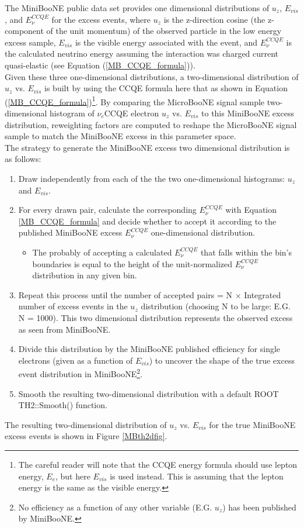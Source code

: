 The MiniBooNE public data set \cite{MB_lee_datarelease} provides one dimensional distributions of $u_z$, $E_{vis}$, and $E_\nu^{CCQE}$ for the excess events, where $u_z$ is the z-direction cosine (the z- component of the unit momentum) of the observed particle in the low energy excess sample, $E_{vis}$ is the visible energy associated with the event, and $E_{\nu}^{CCQE}$ is the calculated neutrino energy assuming the interaction was charged current quasi-elastic (see Equation (\ref{MB_CCQE_formula})).\\

Given these three one-dimensional distributions, a two-dimensional distribution of $u_z$ vs. $E_{vis}$ is built by using the CCQE formula here that as shown in Equation (\ref{MB_CCQE_formula})\footnote{The careful reader will note that the CCQE energy formula should use lepton energy, $E_e$, but here $E_{vis}$ is used instead. This is assuming that the lepton energy is the same as the visible energy.}. By comparing the MicroBooNE signal sample two-dimensional histogram of $\nu_e$CCQE electron $u_z$ vs. $E_{vis}$ to this MiniBooNE excess distribution, reweighting factors are computed to reshape the MicroBooNE signal sample to match the MiniBooNE excess in this parameter space.\\

The strategy to generate the MiniBooNE excess two dimensional distribution is as follows:
\begin{enumerate}
\item Draw independently from each of the the two one-dimensional histograms: $u_z$ and $E_{vis}$.
\item For every drawn pair, calculate the corresponding $E_\nu^{CCQE}$ with Equation \ref{MB_CCQE_formula} and decide whether to accept it according to the published MiniBooNE excess $E_\nu^{CCQE}$ one-dimensional distribution.
	\begin{itemize}
	\item The probably of accepting a calculated $E_\nu^{CCQE}$ that falls within the bin's boundaries is equal to the height of the unit-normalized $E_\nu^{CCQE}$ distribution in any given bin.
	\end{itemize}
\item Repeat this process until the number of accepted pairs = N $\times$ Integrated number of excess events in the $u_z$ distribution (choosing N to be large: E.G. N = 1000). This two dimensional distribution represents the observed excess as seen from MiniBooNE.
\item Divide this distribution by the MiniBooNE published efficiency for single electrons (given as a function of $E_{vis}$) to uncover the shape of the true excess event distribution in MiniBooNE\footnote{No efficiency as a function of any other variable (E.G. $u_z$) has been published by MiniBooNE.}.
\item Smooth the resulting two-dimensional distribution with a default ROOT TH2::Smooth() function.
\end{enumerate}
The resulting two-dimensional distribution of $u_z$ vs. $E_{vis}$ for the true MiniBooNE excess events is shown in Figure \ref{MBth2dfig}.


